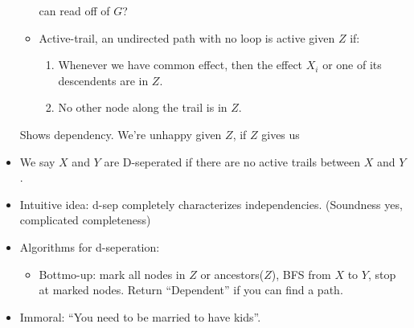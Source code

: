 \begin{itemize}
\begin{itemize}
    can read off of $G$?
  \item Active-trail, an undirected path with no loop is active given
    $Z$ if:
    \begin{enumerate}
    \item Whenever we have common effect, then the effect $X_i$ or one
      of its descendents are in $Z$.
    \item No other node along the trail is in $Z$.
    \end{enumerate}
  \end{itemize}
Shows dependency. We're unhappy given $Z$, if $Z$ gives us 
\item We say $X$ and $Y$ are D-seperated if there are no active trails
  between $X$ and $Y$.
\item Intuitive idea: d-sep completely characterizes
  independencies. (Soundness yes, complicated completeness)
\item Algorithms for d-seperation:
  \begin{itemize}
  \item Bottmo-up: mark all nodes in $Z$ or ancestors($Z$), BFS from
    $X$ to $Y$, stop at marked nodes. Return ``Dependent'' if you can
    find a path.
  \end{itemize}
\item Immoral: ``You need to be married to have kids''.
\end{itemize}



